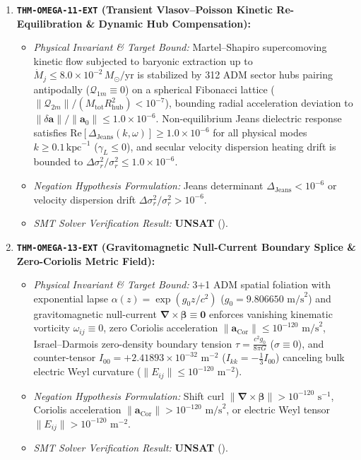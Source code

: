 \documentclass[11pt,onecolumn]{article}
\begin{document}
\begin{enumerate}
    \item \textbf{\texttt{THM-OMEGA-11-EXT} (Transient Vlasov--Poisson Kinetic Re-Equilibration \& Dynamic Hub Compensation):}
    \begin{itemize}
        \item \emph{Physical Invariant \& Target Bound:} Martel--Shapiro supercomoving kinetic flow subjected to baryonic extraction up to $\dot{M}_j \le 8.0 \times 10^{-2}\,M_\odot/\mathrm{yr}$ is stabilized by 312 ADM sector hubs pairing antipodally ($\mathcal{Q}_{1m} \equiv 0$) on a spherical Fibonacci lattice ($\|\mathcal{Q}_{2m}\| / (M_{\mathrm{tot}} R_{\mathrm{hub}}^2) < 10^{-7}$), bounding radial acceleration deviation to $\|\delta\mathbf{a}\| / \|\mathbf{a}_0\| \le 1.0 \times 10^{-6}$. Non-equilibrium Jeans dielectric response satisfies $\mathrm{Re}[\Delta_{\mathrm{Jeans}}(k, \omega)] \ge 1.0 \times 10^{-6}$ for all physical modes $k \ge 0.1\,\mathrm{kpc}^{-1}$ ($\gamma_L \le 0$), and secular velocity dispersion heating drift is bounded to $\Delta\sigma_r^2 / \sigma_r^2 \le 1.0 \times 10^{-6}$.
        \item \emph{Negation Hypothesis Formulation:} Jeans determinant $\Delta_{\mathrm{Jeans}} < 10^{-6}$ or velocity dispersion drift $\Delta\sigma_r^2 / \sigma_r^2 > 10^{-6}$.
        \item \emph{SMT Solver Verification Result:} \textbf{UNSAT} ().
    \end{itemize}

    \item \textbf{\texttt{THM-OMEGA-13-EXT} (Gravitomagnetic Null-Current Boundary Splice \& Zero-Coriolis Metric Field):}
    \begin{itemize}
        \item \emph{Physical Invariant \& Target Bound:} 3+1 ADM spatial foliation with exponential lapse $\alpha(z) = \exp(g_0 z / c^2)$ ($g_0 = 9.806650\text{ m/s}^2$) and gravitomagnetic null-current $\boldsymbol{\nabla}\times\boldsymbol{\beta} \equiv \mathbf{0}$ enforces vanishing kinematic vorticity $\omega_{ij} \equiv 0$, zero Coriolis acceleration $\|\mathbf{a}_{\mathrm{Cor}}\| \le 10^{-120}\text{ m/s}^2$, Israel--Darmois zero-density boundary tension $\tau = \frac{c^2 g_0}{8\pi G}$ ($\sigma \equiv 0$), and counter-tensor $I_{00} = +2.41893 \times 10^{-32}\text{ m}^{-2}$ ($I_{kk} = -\frac{1}{3}I_{00}$) canceling bulk electric Weyl curvature ($\|E_{ij}\| \le 10^{-120}\text{ m}^{-2}$).
        \item \emph{Negation Hypothesis Formulation:} Shift curl $\|\boldsymbol{\nabla}\times\boldsymbol{\beta}\| > 10^{-120}\text{ s}^{-1}$, Coriolis acceleration $\|\mathbf{a}_{\mathrm{Cor}}\| > 10^{-120}\text{ m/s}^2$, or electric Weyl tensor $\|E_{ij}\| > 10^{-120}\text{ m}^{-2}$.
        \item \emph{SMT Solver Verification Result:} \textbf{UNSAT} ().
    \end{itemize}


\end{enumerate}
\end{document}
